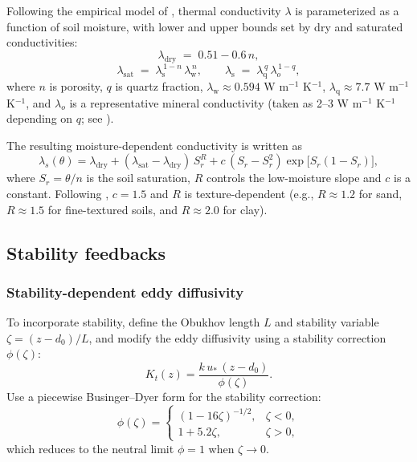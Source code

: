 \documentclass{article}
\begin{document}
    Following the empirical model of \citet{xiong2023new}, thermal conductivity $\lambda$ is parameterized as a function of soil moisture, with lower and upper bounds set by dry and saturated conductivities:
    \begin{equation}
    \lambda_{\mathrm{dry}} \;=\; 0.51 - 0.6\,n,
    \end{equation}
    \begin{equation}
    \lambda_{\mathrm{sat}} \;=\; \lambda_{\mathrm{s}}^{\,1-n}\,\lambda_{\mathrm{w}}^{\,n},
    \qquad
    \lambda_{\mathrm{s}} \;=\; \lambda_{\mathrm{q}}^{\,q}\,\lambda_{o}^{\,1-q},
    \end{equation}
    where $n$ is porosity, $q$ is quartz fraction, $\lambda_{\mathrm{w}} \approx 0.594$ W m$^{-1}$ K$^{-1}$, $\lambda_{\mathrm{q}} \approx 7.7$ W m$^{-1}$ K$^{-1}$, and $\lambda_{o}$ is a representative mineral
    conductivity (taken as 2--3 W m$^{-1}$ K$^{-1}$ depending on $q$; see \citet{xiong2023new}).
    
    The resulting moisture-dependent conductivity is written as
    \begin{equation}
    \label{eq:lambda_xiong}
    \lambda_s(\theta)
    =\lambda_{\mathrm{dry}}
    +(\lambda_{\mathrm{sat}}-\lambda_{\mathrm{dry}})\,S_r^{R}
    +c\,(S_r-S_r^2)\exp\!\bigl[S_r(1-S_r)\bigr],
    \end{equation}
    where $S_r = {\theta}/{n}$ is the soil saturation, 
    $R$ controls the low-moisture slope and $c$ is a constant. Following \citet{xiong2023new}, $c = 1.5$  and $R$ is texture-dependent (e.g., $R\approx 1.2$ for sand, $R\approx 1.5$ for fine-textured soils, and $R\approx 2.0$ for clay).
    
    
    \subsection*{Stability feedbacks}
    
    \subsubsection*{Stability-dependent eddy diffusivity}
    
    To incorporate stability,  define the Obukhov length $L$ and stability variable $\zeta=(z-d_0)/L$, and modify the eddy diffusivity using a stability correction $\phi(\zeta)$:
    \begin{equation}
    K_t(z)=\frac{k\,u_*\,(z-d_0)}{\phi(\zeta)}.
    \end{equation}
    Use a piecewise Businger--Dyer form for the stability correction:
    \begin{equation}
    \phi(\zeta)=
    \begin{cases}
    (1-16\zeta)^{-1/2}, & \zeta<0,\\[4pt]
    1+5.2\zeta, & \zeta>0,
    \end{cases}
    \end{equation}
    which reduces to the neutral limit $\phi=1$ when $\zeta\to 0$.
    
\end{document}
